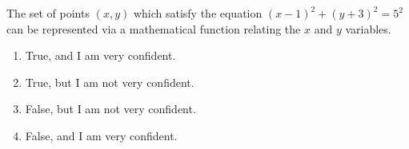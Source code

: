 \bigskip


\item The set of points $(x,y)$ which satisfy the equation $(x-1)^2 + (y+3)^2 = 5^2$ can be represented via a mathematical function relating the $x$ and $y$ variables.

\begin{enumerate}
\item True, and I am very confident.
\item True, but I am not very confident.
\item False, but I am not very confident.
\item False, and I am very confident.
\end{enumerate}


